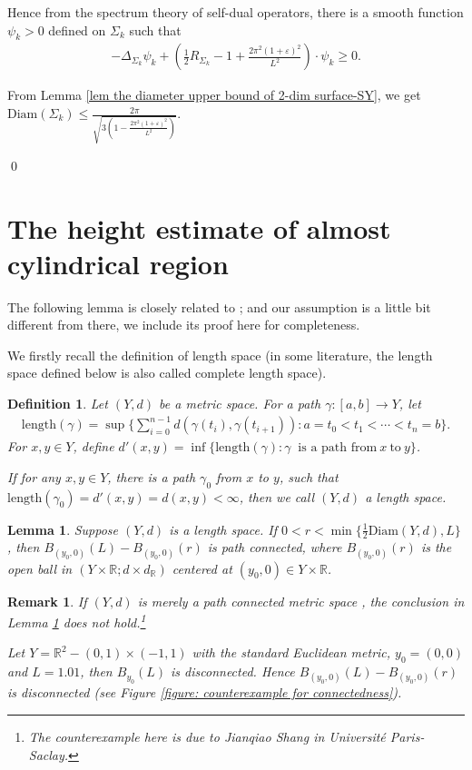 \documentclass[11pt]{amsart}
\newtheorem{lemma}[theorem]{Lemma}
\newtheorem{remark}[theorem]{Remark}
\newtheorem{definition}[theorem]{Definition}
\numberwithin{equation}{section}
\begin{document}
{Hence from the spectrum theory of self-dual operators,  there is a smooth function $\psi_k> 0$ defined on $\Sigma_k$ such that 
\begin{align}
-\Delta_{\Sigma_k} \psi_k+ (\frac{1}{2}R_{\Sigma_k}-1+ \frac{2\pi^2(1+\varepsilon)^2}{L^2})\cdot \psi_k \geq 0 . \nonumber 
\end{align}

From Lemma \ref{lem the diameter upper bound of 2-dim surface-SY}, we get $\displaystyle \mathrm{Diam}(\Sigma_k)\leq \frac{2\pi}{\sqrt{3(1- \frac{2\pi^2(1+ \varepsilon)^2}{L^2})}}$. 
}
\qed

\section{The height estimate of almost cylindrical region}\label{sec radius est for annulus}

The following lemma is closely related to \cite[Proposition $A. 4$]{CLS}; and our assumption is a little bit different from there,  we include its proof here for completeness.

We firstly recall the definition of length space (in some literature,  the length space defined below is also called complete length space).
\begin{definition}
    Let $(Y, d)$ be a metric space. For a path $\gamma:[a,b]\to Y$, let
    \begin{align*}
        \mathrm{length}(\gamma)=\sup\Big\{\sum_{i=0}^{n-1} d(\gamma(t_i),\gamma(t_{i+1})):a= t_0<t_1<\cdots<t_{n}=b\Big\}.
    \end{align*}
    For $x,y\in Y$, define $\displaystyle d'(x,y)=\inf\{\mathrm{length}(\gamma):\gamma\ \text{ is a path from}\ x \ \text{to}\ y\}$.  
    
If for any $x,y\in Y$, there is a path $\gamma_0$ from $x$ to $y$, such that $\mathrm{length}(\gamma_0)=d'(x,y)=d(x,y)<\infty$, then we call $(Y, d)$ a length space.
\end{definition}

\begin{lemma}\label{lem connected of some set}
{Suppose $(Y,  d)$ is a length space.  If $\displaystyle 0< r< \min\{\frac{1}{2}\mathrm{Diam}(Y, d),  L\}$,  then $B_{(y_0, 0)}(L)- B_{(y_0, 0)}(r)$ is path connected,  where $B_{(y_0,  0)}(r)$ is the open ball in $(Y\times \mathbb{R};  d\times d_{\mathbb{R}})$ centered at $(y_0, 0)\in Y\times \mathbb{R}$.  
}
\end{lemma}

\begin{remark}\label{rem counterexample}
    If $(Y,d)$ is merely a path connected metric space , the conclusion in Lemma \ref{lem connected of some set} does not hold.\footnote{The counterexample here is due to Jianqiao Shang in Université Paris-Saclay.}

    Let $Y=\mathbb{R}^2-(0,1)\times(-1,1)$ with the standard Euclidean metric, $y_0=(0,0)$ and $L=1.01$, then $B_{y_0}(L)$ is disconnected. Hence $B_{(y_0, 0)}(L)- B_{(y_0, 0)}(r)$ is disconnected (see Figure \ref{figure: counterexample for connectedness}).
\end{remark}
\end{document}
